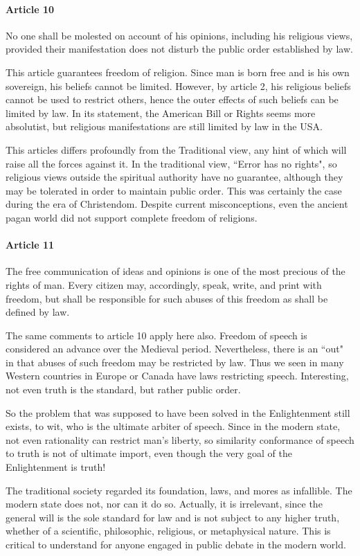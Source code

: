 \paragraph{Article 10}
\begin{quotex}
No one shall be molested on account of his opinions, including his religious views, provided their manifestation does not disturb the public order established by law. 

\end{quotex}
This article guarantees freedom of religion. Since man is born free and is his own sovereign, his beliefs cannot be limited. However, by article 2, his religious beliefs cannot be used to restrict others, hence the outer effects of such beliefs can be limited by law. In its statement, the American Bill or Rights seems more absolutist, but religious manifestations are still limited by law in the USA.

This articles differs profoundly from the Traditional view, any hint of which will raise all the forces against it. In the traditional view, ``Error has no rights", so religious views outside the spiritual authority have no guarantee, although they may be tolerated in order to maintain public order. This was certainly the case during the era of Christendom. Despite current misconceptions, even the ancient pagan world did not support complete freedom of religions.

\paragraph{Article 11}
\begin{quotex}
The free communication of ideas and opinions is one of the most precious of the rights of man. Every citizen may, accordingly, speak, write, and print with freedom, but shall be responsible for such abuses of this freedom as shall be defined by law. 

\end{quotex}
The same comments to article 10 apply here also. Freedom of speech is considered an advance over the Medieval period. Nevertheless, there is an ``out" in that abuses of such freedom may be restricted by law. Thus we seen in many Western countries in Europe or Canada have laws restricting speech. Interesting, not even truth is the standard, but rather public order.

So the problem that was supposed to have been solved in the Enlightenment still exists, to wit, who is the ultimate arbiter of speech. Since in the modern state, not even rationality can restrict man's liberty, so similarity conformance of speech to truth is not of ultimate import, even though the very goal of the Enlightenment is truth!

The traditional society regarded its foundation, laws, and mores as infallible. The modern state does not, nor can it do so. Actually, it is irrelevant, since the general will is the sole standard for law and is not subject to any higher truth, whether of a scientific, philosophic, religious, or metaphysical nature. This is critical to understand for anyone engaged in public debate in the modern world.



